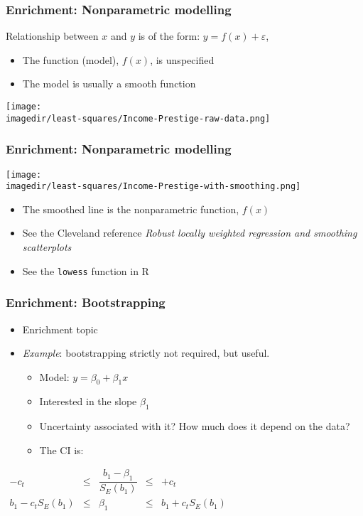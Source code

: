 \begin{frame}\frametitle{Enrichment: Nonparametric modelling}
	
	Relationship between $x$ and $y$ is of the form: $y = f(x) + \varepsilon$, 
	\begin{itemize}
		\item	The function (model), $f(x)$, is unspecified 
		\item	The model is usually a smooth function 
	\end{itemize}
	\begin{center}
		\texttt{[image: \\imagedir/least-squares/Income-Prestige-raw-data.png]}
	\end{center}
\end{frame}

\begin{frame}\frametitle{Enrichment: Nonparametric modelling}
	\begin{center}
		\texttt{[image: \\imagedir/least-squares/Income-Prestige-with-smoothing.png]}
	\end{center}
	\begin{itemize}
		\item	The smoothed line is the nonparametric function, $f(x)$ 
		\item	See the Cleveland reference \emph{Robust locally weighted regression and smoothing scatterplots} 
		\item	See the \texttt{lowess} function in R 
	\end{itemize}
\end{frame}

\begin{frame}\frametitle{Enrichment: Bootstrapping}
	\begin{itemize}
		\item	Enrichment topic 
		\item	\emph{Example}: bootstrapping strictly not required, but useful. 
		\begin{itemize}
			\item	Model: $y = \beta_0 + \beta_1 x$ 
			\item	Interested in the slope $\beta_1$ 
			\item	Uncertainty associated with it? How much does it depend on the data? 
			\item	The CI is: 
		\end{itemize}
	\end{itemize}
	$ 
	\begin{array}{rcccl}
		- c_t &\leq& \dfrac{b_1 - \beta_1}{S_E(b_1)} &\leq & +c_t\\
		b_1 - c_t S_E(b_1) &\leq& \beta_1 &\leq& b_1 + c_t S_E(b_1) 
	\end{array}
	$
\end{frame}

